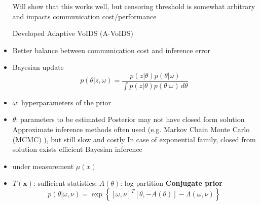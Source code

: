 \documentclass[t, mathserif]{beamer}
\begin{document}
\begin{frame}
\begin{tcolorbox}[width=.25\textwidth,after=\hfill,equal height group=B,adjusted title=Our Method: Efficient Distributed Inference]
\begin{itemize}
\jtem Will show that this works well, but censoring threshold is somewhat arbitrary and impacts communication cost/performance


	\jtem Developed Adaptive VoIDS (A-VoIDS) \cite{Mu13_Aut}
		\bii
			\item Better balance between communication cost and inference error
		\ei
\end{itemize}
\end{tcolorbox}
\begin{tcolorbox}[width=.24\textwidth,after=,equal height group=B,adjusted title=Bayesian Update]
\begin{itemize}	
  	\item Bayesian update
		       $$p (\theta|z,\omega) = \frac { p (z|\theta) p (\theta|\omega)} {\displaystyle \int p(z|\theta) p (\theta|\omega)\,d\theta} $$
		\bii
			\item $\omega$: hyperparameters of the prior
			\item $\theta$: parameters to be estimated
		\ei
	\jtem Posterior may not have closed form solution
	\jtem Approximate inference methods often used (e.g. Markov Chain Monte Carlo (MCMC) \cite{gelman04}), but still slow and costly
	\jtem In case of exponential family, \alert{closed from solution} exists \njra efficient Bayesian inference
\end{itemize}
\end{tcolorbox}
\begin{tcolorbox}[width=.24\textwidth,equal height group=B,adjusted title={Exponential Family and Conjugate Prior}]
\begin{itemize}
	\jtem \textbf{Exponential Family}
			$$p(\mathbf{x}|\theta) = \exp\left\{ \theta^T T(\mathbf{x}) - A(\theta)\right\}$$
		\bii
			\item under measurement $\mu(x)$
			\item $T(\mathbf{x})$: sufficient statistics; $A(\theta)$: log partition
		\ei
	\jtem \textbf{Conjugate prior}
			$$ p(\theta|\omega,\nu) = \exp \left\{ [\omega, \nu]^T [\theta,-A(\theta)] - \Lambda (\omega,\nu) \right\}$$

\end{itemize}
\end{tcolorbox}
\end{frame}
\end{document}
